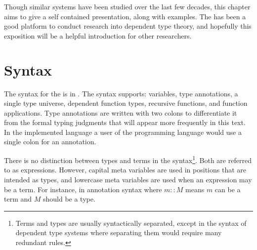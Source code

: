 Though similar systems have been studied over the last few decades, this chapter aims to give a self contained presentation, along with examples.
The \slang{} has been a good platform to conduct research into \fullSp{} dependent type theory, and hopefully this exposition will be a helpful introduction for other researchers.
 
\section{\SLang{} Syntax}
 
The syntax for the \slang{} is in .
The syntax supports: variables, type annotations, a single type universe, dependent function types, recursive functions, and function applications.
Type annotations are written with two colons to differentiate it from the formal typing judgments that will appear more frequently in this text.
In the implemented language a user of the programming language would use a single colon for an annotation.
 
There is no distinction between types and terms in the syntax\footnote{
  Terms and types are usually syntactically separated, except in the syntax of \fullSp{} dependent type systems where separating them would require many redundant rules.
}.
Both are referred to as expressions.
However, capital meta variables are used in positions that are intended as types, and lowercase meta variables are used when an expression may be a term.
For instance, in annotation syntax where $m::M$ means $m$ can be a term and $M$ should be a type.
 
 
